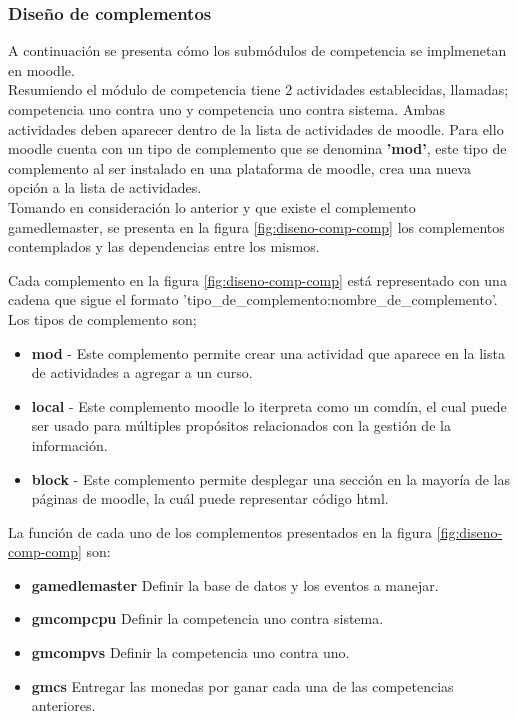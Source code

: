 

\subsubsection{Diseño de complementos}



A continuación se presenta cómo los submódulos de competencia
se implmenetan en moodle.\\


\noindent Resumiendo el módulo de competencia tiene 2 actividades establecidas, llamadas; 
competencia uno contra uno y competencia uno contra sistema. 
Ambas actividades deben aparecer dentro de la lista de actividades de moodle. Para ello 
moodle cuenta con un tipo de complemento que se denomina \textbf{'mod'}, este tipo de complemento al ser instalado 
en una plataforma de moodle, crea una nueva opción a la lista de actividades.\\

\noindent Tomando en consideración lo anterior y que existe el complemento gamedlemaster, se presenta en la figura \ref{fig:diseno-comp-comp}
los complementos contemplados y las dependencias entre los mismos.




Cada complemento en la figura \ref{fig:diseno-comp-comp} está representado con una cadena que sigue el formato 'tipo\_de\_complemento:nombre\_de\_complemento'. Los tipos de complemento son;
\begin{itemize}
    \item \textbf{mod} - Este complemento permite crear una actividad que aparece en la lista de actividades a agregar a un curso.
    \item \textbf{local} -  Este complemento moodle lo iterpreta como un comdín, el cual puede ser usado para múltiples propósitos relacionados con la gestión de la información.
    \item \textbf{block} - Este complemento permite desplegar una sección en la mayoría de las páginas de moodle, la cuál puede representar código html. 
\end{itemize}

La función de cada uno de los complementos presentados en la figura \ref{fig:diseno-comp-comp} son:


\begin{itemize}
    \item \textbf{gamedlemaster} Definir la base de datos y los eventos a manejar.
    \item \textbf{gmcompcpu} Definir la competencia uno contra sistema.
    \item \textbf{gmcompvs} Definir la competencia uno contra uno.
    \item \textbf{gmcs} Entregar las monedas por ganar cada una de las competencias anteriores.
\end{itemize}

